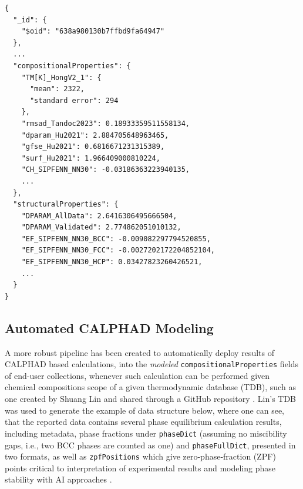 \begin{verbatim}
{
  "_id": {
    "$oid": "638a980130b7ffbd9fa64947"
  },
  ...
  "compositionalProperties": {
    "TM[K]_HongV2_1": {
      "mean": 2322,
      "standard error": 294
    },
    "rmsad_Tandoc2023": 0.18933359511558134,
    "dparam_Hu2021": 2.884705648963465,
    "gfse_Hu2021": 0.6816671231315389,
    "surf_Hu2021": 1.966409000810224,
    "CH_SIPFENN_NN30": -0.03186363223940135,
    ...
  },
  "structuralProperties": {
    "DPARAM_AllData": 2.6416306495666504,
    "DPARAM_Validated": 2.774862051010132,
    "EF_SIPFENN_NN30_BCC": -0.009082297794520855,
    "EF_SIPFENN_NN30_FCC": -0.0027202172204852104,
    "EF_SIPFENN_NN30_HCP": 0.03427823260426521,
    ...
  }
}
\end{verbatim}


\subsection{Automated CALPHAD Modeling} \label{ultera:ssec:autocalphad}

A more robust pipeline has been created to automatically deploy results of CALPHAD \cite{Olson2023GenomicDynamics} based calculations, into the \emph{modeled} \texttt{compositionalProperties} fields of end-user collections, whenever such calculation can be performed given chemical compositions scope of a given thermodynamic database (TDB), such as one created by Shuang Lin and shared through a GitHub repository \cite{LinShuangLin212/refractory-elements-database:ZR}. Lin's TDB was used to generate the example of data structure below, where one can see, that the reported data contains several phase equilibrium calculation results, including metadata, phase fractions under \texttt{phaseDict} (assuming no miscibility gaps, i.e., two BCC phases are counted as one) and \texttt{phaseFullDict}, presented in two formats, as well as \texttt{zpfPositions} which give zero-phase-fraction (ZPF) points critical to interpretation of experimental results \cite{Li2024DesignExperiments} and modeling phase stability with AI approaches \cite{Wu2023EstimatingApproach}.

